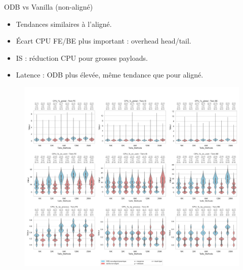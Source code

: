 \documentclass[aspectratio=43,8pt]{beamer}
\begin{document}
\begin{frame}{ODB vs Vanilla (non-aligné)}
\begin{itemize}
    \item Tendances similaires à l'aligné.
    \item Écart CPU FE/BE plus important : overhead head/tail.
    \item IS : réduction CPU pour grosses payloads.
    \item Latence : ODB plus élevée, même tendance que pour aligné.
\end{itemize}
\begin{figure}
    \includegraphics[width=\textwidth]{results/results-cmp/odb_dynamic_vs_vanilla_unaligned.png}
\end{figure}
\end{frame}
\end{document}
